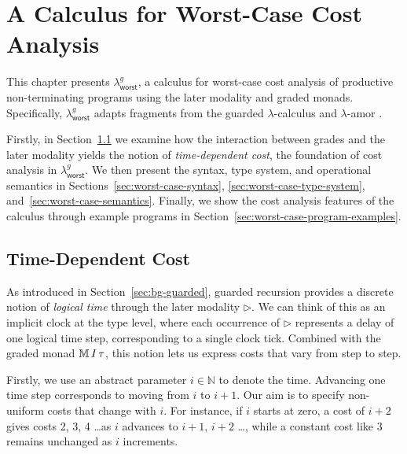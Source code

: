 \chapter{A Calculus for Worst-Case Cost Analysis}
\label{chap:4}
\raggedbottom

\begingroup
\renewcommand{\topfraction}{0.9}
\renewcommand{\bottomfraction}{0.8}
\renewcommand{\textfraction}{0.1}
\renewcommand{\floatpagefraction}{0.75}
\setlength{\textfloatsep}{12pt plus 2pt minus 2pt}
\setlength{\intextsep}{10pt plus 2pt minus 2pt}
\setlength{\floatsep}{10pt plus 2pt minus 2pt}
\makeatletter
\setlength{\@fptop}{0pt}
\setlength{\@fpsep}{16pt plus 2pt}
\setlength{\@fpbot}{0pt plus 1fil}
\makeatother

This chapter presents $\lambda^g_{\mathsf{worst}}$, a calculus for worst-case cost analysis of productive non-terminating programs using 
the later modality and graded monads.
Specifically, $\lambda^g_{\mathsf{worst}}$ adapts fragments from the guarded $\lambda$-calculus \citep{cloustonGuardedLambdaCalculusProgramming2017a}
and $\lambda$-amor \citep{rajaniUnifyingTypetheoryHigherorder2021a}.

Firstly, in Section~\ref{sec:cost-foundation} we examine how the interaction between grades and the later modality yields the notion of \emph{time-dependent cost}, 
the foundation of cost analysis in $\lambda^g_{\mathsf{worst}}$. 
We then present the syntax, type system, and operational semantics in
Sections~\ref{sec:worst-case-syntax}, \ref{sec:worst-case-type-system},
and~\ref{sec:worst-case-semantics}.
Finally, we show the cost analysis features of the calculus through example programs in Section~\ref{sec:worst-case-program-examples}.
\FloatBarrier

\section{Time-Dependent Cost}
\label{sec:cost-foundation}
As introduced in Section~\ref{sec:bg-guarded}, guarded recursion provides a discrete notion of \emph{logical time} through the later modality $\triangleright$. 
We can think of this as an implicit clock at the type level, where each occurrence of $\triangleright$ represents a delay of one logical time step, corresponding to a single clock tick.
Combined with the graded monad $\mathbb{M}\,{I}\, \tau$, this notion lets us express costs that vary from step to step.

Firstly, we use an abstract parameter $i\in\mathbb N$ to denote the time. Advancing one time step corresponds to moving from $i$ to $i+1$. 
Our aim is to specify non-uniform costs that change with $i$. For instance, if $i$ starts at zero, a cost of $i+2$ 
gives costs 2, 3, 4 \dots as $i$ advances to $i+1$, $i+2$ \dots, while a constant cost like 3 remains unchanged as $i$ increments.

